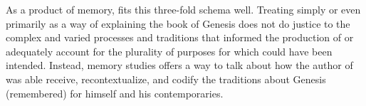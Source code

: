 As a product of memory, \ga fits this three-fold schema well. Treating \ga simply or even primarily as a way of explaining the book of Genesis does not do justice to the complex and varied processes and traditions that informed the production of \ga or adequately account for the plurality of purposes for which \ga could have been intended. Instead, memory studies offers a way to talk about how the author of \ga was able receive, recontextualize, and codify the traditions about Genesis (remembered) for himself and his contemporaries.


